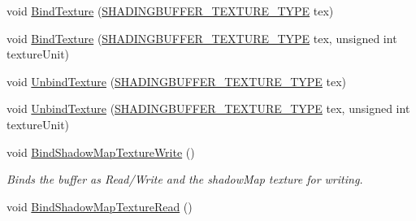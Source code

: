 \begin{DoxyCompactItemize}
void \mbox{\hyperlink{class_geometry_engine_1_1_geometry_buffer_1_1_shading_buffer_a5c7fdd4a5e773750005956bdd923759e}{Bind\+Texture}} (\mbox{\hyperlink{class_geometry_engine_1_1_geometry_buffer_1_1_shading_buffer_a8047a079ff9fb9fa3400651664c92ae9}{S\+H\+A\+D\+I\+N\+G\+B\+U\+F\+F\+E\+R\+\_\+\+T\+E\+X\+T\+U\+R\+E\+\_\+\+T\+Y\+PE}} tex)
\item 
void \mbox{\hyperlink{class_geometry_engine_1_1_geometry_buffer_1_1_shading_buffer_a1122ec03dd6ffcaf19ac4370b1ef5cb8}{Bind\+Texture}} (\mbox{\hyperlink{class_geometry_engine_1_1_geometry_buffer_1_1_shading_buffer_a8047a079ff9fb9fa3400651664c92ae9}{S\+H\+A\+D\+I\+N\+G\+B\+U\+F\+F\+E\+R\+\_\+\+T\+E\+X\+T\+U\+R\+E\+\_\+\+T\+Y\+PE}} tex, unsigned int texture\+Unit)
\item 
void \mbox{\hyperlink{class_geometry_engine_1_1_geometry_buffer_1_1_shading_buffer_acd58b856df03ec7eec5313356c3f8c46}{Unbind\+Texture}} (\mbox{\hyperlink{class_geometry_engine_1_1_geometry_buffer_1_1_shading_buffer_a8047a079ff9fb9fa3400651664c92ae9}{S\+H\+A\+D\+I\+N\+G\+B\+U\+F\+F\+E\+R\+\_\+\+T\+E\+X\+T\+U\+R\+E\+\_\+\+T\+Y\+PE}} tex)
\item 
void \mbox{\hyperlink{class_geometry_engine_1_1_geometry_buffer_1_1_shading_buffer_ad80b99462f09f88f2937542b72d909f9}{Unbind\+Texture}} (\mbox{\hyperlink{class_geometry_engine_1_1_geometry_buffer_1_1_shading_buffer_a8047a079ff9fb9fa3400651664c92ae9}{S\+H\+A\+D\+I\+N\+G\+B\+U\+F\+F\+E\+R\+\_\+\+T\+E\+X\+T\+U\+R\+E\+\_\+\+T\+Y\+PE}} tex, unsigned int texture\+Unit)
\item 
\mbox{\label{class_geometry_engine_1_1_geometry_buffer_1_1_shading_buffer_a4f1c4f4a0638ebb9572ee8562192e279}} 
void \mbox{\hyperlink{class_geometry_engine_1_1_geometry_buffer_1_1_shading_buffer_a4f1c4f4a0638ebb9572ee8562192e279}{Bind\+Shadow\+Map\+Texture\+Write}} ()
\begin{DoxyCompactList}\small\item\em Binds the buffer as Read/\+Write and the shadow\+Map texture for writing. \end{DoxyCompactList}\item 
\mbox{\label{class_geometry_engine_1_1_geometry_buffer_1_1_shading_buffer_aa34e7d2ba972f96eb6da9bdbd07e4245}} 
void \mbox{\hyperlink{class_geometry_engine_1_1_geometry_buffer_1_1_shading_buffer_aa34e7d2ba972f96eb6da9bdbd07e4245}{Bind\+Shadow\+Map\+Texture\+Read}} ()

\end{DoxyCompactItemize}

